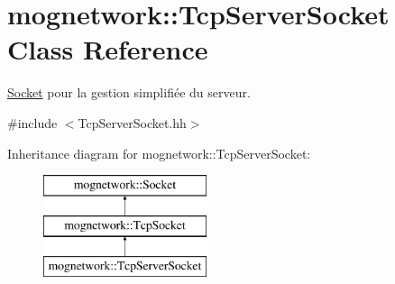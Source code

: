 \hypertarget{classmognetwork_1_1_tcp_server_socket}{\section{mognetwork\-:\-:Tcp\-Server\-Socket Class Reference}
\label{classmognetwork_1_1_tcp_server_socket}
}


\hyperlink{classmognetwork_1_1_socket}{Socket} pour la gestion simplifiée du serveur.  




{\ttfamily \#include $<$Tcp\-Server\-Socket.\-hh$>$}

Inheritance diagram for mognetwork\-:\-:Tcp\-Server\-Socket\-:\begin{figure}[H]
\begin{center}
\leavevmode
\includegraphics[height=3.000000cm]{classmognetwork_1_1_tcp_server_socket}
\end{center}
\end{figure}
